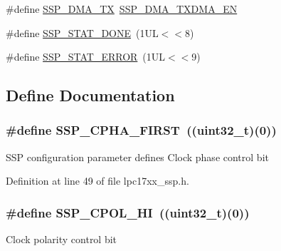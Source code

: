 \begin{DoxyCompactItemize}
\item 
\#define \hyperlink{group___s_s_p___public___macros_ga442c2b693b567292aaa17bdba6789094}{\-S\-S\-P\-\_\-\-D\-M\-A\-\_\-\-T\-X}~\hyperlink{group___s_s_p___private___macros_gaafe065e1865ad37d436c5f000f9653ab}{\-S\-S\-P\-\_\-\-D\-M\-A\-\_\-\-T\-X\-D\-M\-A\-\_\-\-E\-N}
\item 
\#define \hyperlink{group___s_s_p___public___macros_ga50dbb53cd4d651137a9826f1cee0156b}{\-S\-S\-P\-\_\-\-S\-T\-A\-T\-\_\-\-D\-O\-N\-E}~(1\-U\-L$<$$<$8)
\item 
\#define \hyperlink{group___s_s_p___public___macros_ga6fadaf52886e10c84c3461b43c216de4}{\-S\-S\-P\-\_\-\-S\-T\-A\-T\-\_\-\-E\-R\-R\-O\-R}~(1\-U\-L$<$$<$9)
\end{DoxyCompactItemize}


\subsection{\-Define \-Documentation}
\hypertarget{group___s_s_p___public___macros_ga6333b5eaf9d5301431fc0399c0d417d5}{
\subsubsection[{\-S\-S\-P\-\_\-\-C\-P\-H\-A\-\_\-\-F\-I\-R\-S\-T}]{\setlength{\rightskip}{0pt plus 5cm}\#define {\bf \-S\-S\-P\-\_\-\-C\-P\-H\-A\-\_\-\-F\-I\-R\-S\-T}~((uint32\-\_\-t)(0))}}\label{group___s_s_p___public___macros_ga6333b5eaf9d5301431fc0399c0d417d5}
\-S\-S\-P configuration parameter defines \-Clock phase control bit 

\-Definition at line 49 of file lpc17xx\-\_\-ssp.\-h.

\hypertarget{group___s_s_p___public___macros_gaf64aec37a92ca6c14c23af6fc0052ccb}{
\subsubsection[{\-S\-S\-P\-\_\-\-C\-P\-O\-L\-\_\-\-H\-I}]{\setlength{\rightskip}{0pt plus 5cm}\#define {\bf \-S\-S\-P\-\_\-\-C\-P\-O\-L\-\_\-\-H\-I}~((uint32\-\_\-t)(0))}}\label{group___s_s_p___public___macros_gaf64aec37a92ca6c14c23af6fc0052ccb}
\-Clock polarity control bit 

